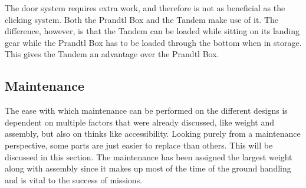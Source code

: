 The door system requires extra work, and therefore is not as beneficial as the clicking system. Both the Prandtl Box and the Tandem make use of it. The difference, however, is that the Tandem can be loaded while sitting on its landing gear while the Prandtl Box has to be loaded through the bottom when in storage. This gives the Tandem an advantage over the Prandtl Box.





\begin{comment}
I took this out, it's just a comment since I didn't want to remove all of it straight away x steph

For a successful mission performance, it is very important that the payload can be carried reliably. The reliability of the payload mounting system can be assumed equal for each design, however some designs are more susceptible to centre of gravity variation. 

The Tandem, Winged Quadcopter, Prandtl Box and Tiltrotor each have a larger range of stable centre of gravity positions. This is due to the fact that they either have wings or tails at the back for stability purposes. Since the tandem concept has no tail, the others have an advantage over it in terms of stability.

The tailsitter concept however is a based on a flying wing design. One major disadvantage of flying wings is the allowable range of centre of gravity. This can become a reliability concern which can be solved using a fixed payload bay. In addition to this, the payload has to be distributed equally over the payload bay in order to not shift the centre of gravity. 
\end{comment}










\subsection{Maintenance}


The ease with which maintenance can be performed on the different designs is dependent on multiple factors that were already discussed, like weight and assembly, but also on thinks like accessibility. Looking purely from a maintenance perspective, some parts are just easier to replace than others. This will be discussed in this section. The maintenance has been assigned the largest weight along with assembly since it makes up most of the time of the ground handling and is vital to the success of missions.

